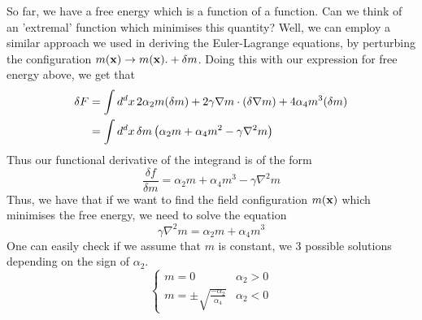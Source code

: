 So far, we have a free energy which is a function of a function. Can we think of an 'extremal' function which minimises this quantity? Well, we can employ a similar approach we used in deriving the Euler-Lagrange equations, by perturbing the configuration $ m ( \mathbf{ x} ) \rightarrow m ( \mathbf{ x} ).  + \delta m  $. Doing this with our expression for free energy above, we get that 
\begin{align*} 
\delta F & = \int d^d x \, 2 \alpha_2 m ( \delta m ) +  2\gamma \nabla m \cdot ( \delta \nabla m ) + 4 \alpha_4 m^3 ( \delta m ) \\
	&= \int d^d x \, \delta m \left( \alpha_2 m + \alpha_4 m^2  - \gamma \nabla^ 2  m \right) 
\end{align*} 
Thus our functional derivative of the integrand is of the form 
\[ 	
\frac{ \delta f }{ \delta m } = \alpha_2 m + \alpha_4 m^3  - \gamma \nabla^2 m 
\] Thus, we have that if we want to find the field configuration $m ( \mathbf{ x} )$ which minimises the free energy, we need to solve the equation 
\[ 
\gamma \nabla^2 m = \alpha_2 m + \alpha_4 m^3 
\] One can easily check if we assume that $m $ is constant, we 3 possible solutions depending on the sign of $\alpha_2$. 
\[ 
\begin{cases} 
m = 0 & \alpha_2 > 0 \\
m = \pm \sqrt{ \frac{  - \alpha_2 }{ \alpha_4 } } & \alpha_2< 0  
\end{cases}
\] 

